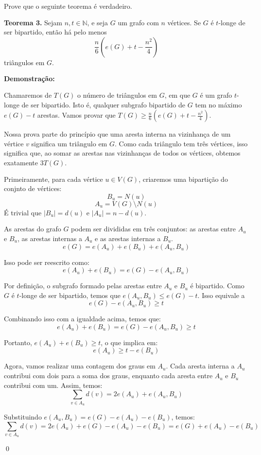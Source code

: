 \documentclass[12pt]{article}
\newenvironment{problem}[2][Exercício]{\begin{trivlist}
\item[\hskip \labelsep {\bfseries #1}\hskip \labelsep {\bfseries #2.}]}{\end{trivlist}}
\newenvironment{sol}
    {\textbf{Demonstração:}\emph{}
    }
    {
    \qed
    }
\begin{document}
\begin{problem}{6}
    Prove que o seguinte teorema é verdadeiro.
    
    \textbf{Teorema 3.} Sejam $n, t \in \mathbb{N}$, e seja $G$ um grafo com $n$ vértices. Se $G$ é $t$-longe de ser bipartido, então há pelo menos
    \[
        \frac{n}{6} \left( e(G) + t - \frac{n^2}{4} \right)
    \]
    triângulos em $G$.
\end{problem}
\begin{sol}
    Chamaremos de $T(G)$ o número de triângulos em $G$, em que $G$ é um grafo $t$-longe
    de ser bipartido. Isto é, qualquer subgrafo bipartido de $G$ tem no máximo $e(G) - t$ arestas.
    Vamos provar que $T(G) \geq \frac{n}{6} \left( e(G) + t - \frac{n^2}{4} \right)$.

    Nossa prova parte do princípio que uma aresta interna na vizinhança de um vértice $v$
    significa um triângulo em $G$. Como cada triângulo tem três vértices, isso significa que,
    ao somar as arestas nas vizinhanças de todos os vértices, obtemos exatamente $3T(G)$.

    Primeiramente, para cada vértice $u\in V(G)$, criaremos uma bipartição do conjnto de vértices:
    $$B_u = N(u)$$
    $$A_u = V(G)\setminus N(u)$$
    É trivial que $|B_u| = d(u)$ e $|A_u| = n - d(u)$.

    As arestas do grafo $G$ podem ser divididas em três conjuntos:
    as arestas entre $A_u$ e $B_u$, as arestas internas a $A_u$ e as arestas internas a $B_u$.
    $$e(G) = e(A_u)+e(B_u)+e(A_u,B_u)$$

    Isso pode ser reescrito como:
    $$e(A_u)+e(B_u) = e(G) - e(A_u,B_u)$$

    Por definição, o subgrafo formado pelas arestas entre $A_u$ e $B_u$ é bipartido.
    Como $G$ é $t$-longe de ser bipartido, temos que $e(A_u,B_u) \leq e(G) - t$. Isso equivale a
    $$e(G) - e(A_u,B_u) \geq t$$
    
    Combinando isso com a igualdade acima, temos que:
    $$e(A_u)+e(B_u) = e(G) - e(A_u,B_u) \geq t$$

    Portanto, $e(A_u)+e(B_u) \geq t$, o que implica em:
    $$e(A_u) \geq t - e(B_u)$$
    
    Agora, vamos realizar uma contagem dos graus em $A_u$. Cada aresta interna a $A_u$
    contribui com dois para a soma dos graus, enquanto cada aresta entre $A_u$ e $B_u$
    contribui com um. Assim, temos:
    $$\sum_{v\in A_u} d(v) = 2e(A_u) + e(A_u,B_u)$$

    Substituindo $e(A_u,B_u) = e(G) - e(A_u) - e(B_u)$, temos:
    $$\sum_{v\in A_u} d(v) = 2e(A_u) + e(G) - e(A_u) - e(B_u) = e(G) + e(A_u) - e(B_u)$$


\end{sol}
\end{document}
